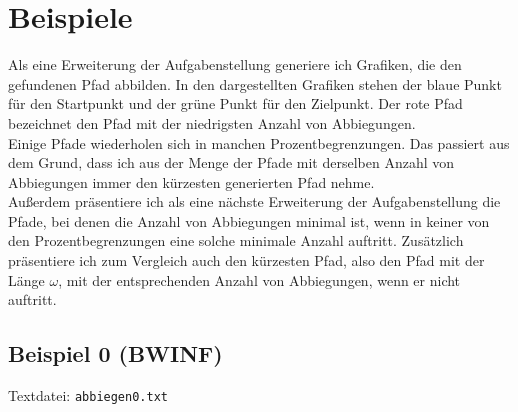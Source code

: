\documentclass[a4paper,10pt,ngerman]{scrartcl}
\begin{document}
\section{Beispiele}
Als eine Erweiterung der Aufgabenstellung generiere ich Grafiken, die den gefundenen Pfad abbilden.
In den dargestellten Grafiken stehen der blaue Punkt für den Startpunkt und der grüne Punkt
für den Zielpunkt. Der rote Pfad bezeichnet den Pfad mit der niedrigsten Anzahl von Abbiegungen.\\
Einige Pfade wiederholen sich in manchen Prozentbegrenzungen. Das passiert aus dem Grund, dass
ich aus der Menge der Pfade mit derselben Anzahl von Abbiegungen immer den kürzesten generierten Pfad nehme.\\
Außerdem präsentiere ich als eine nächste Erweiterung der Aufgabenstellung die Pfade,
bei denen die Anzahl von Abbiegungen minimal ist, wenn in keiner von den Prozentbegrenzungen
eine solche minimale Anzahl auftritt. Zusätzlich präsentiere ich zum Vergleich auch den kürzesten Pfad, also den Pfad
mit der Länge $\omega$, mit der entsprechenden Anzahl von Abbiegungen, wenn er nicht auftritt.

\subsection{Beispiel 0 (BWINF)}
Textdatei: \texttt{abbiegen0.txt}
\end{document}
